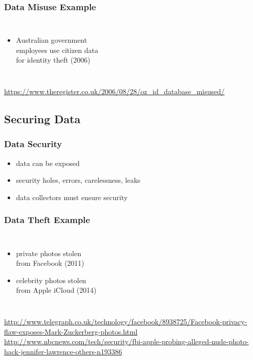 \documentclass[dvipsnames]{beamer}
\theoremstyle{plain}
\begin{document}
\begin{frame}
  \frametitle{Data Misuse Example}

  \begin{columns}

    \begin{itemize}
      \item Australian government\\
        employees use citizen data\\
        for identity theft (2006)
    \end{itemize}
  \end{columns}

  \medskip
  \tiny{\url{https://www.theregister.co.uk/2006/08/28/oz_id_database_misused/}}\\
\end{frame}

\subsection{Securing Data}

\begin{frame}
  \frametitle{Data Security}

  \begin{itemize}
    \item data can be exposed
    \item security holes, errors, carelessness, leaks

    \bigskip
    \item data collectors must ensure security
  \end{itemize}
\end{frame}

\begin{frame}
  \frametitle{Data Theft Example}

  \begin{columns}

    \begin{itemize}
      \item private photos stolen\\
        from Facebook (2011)
    \item celebrity photos stolen\\
      from Apple iCloud (2014)
    \end{itemize}
  \end{columns}

  \medskip
  \tiny{\url{http://www.telegraph.co.uk/technology/facebook/8938725/Facebook-privacy-flaw-exposes-Mark-Zuckerberg-photos.html}}\\
  \smallskip
  \tiny{\url{http://www.nbcnews.com/tech/security/fbi-apple-probing-alleged-nude-photo-hack-jennifer-lawrence-others-n193386}}\\
\end{frame}
\end{document}
